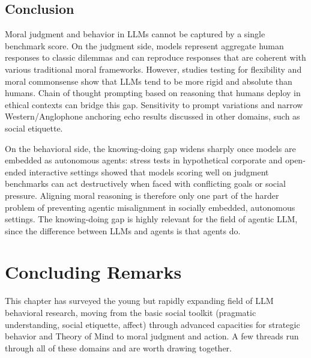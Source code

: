 \subsection{Conclusion}
Moral judgment and behavior in LLMs cannot be captured by a single benchmark score. On the judgment side, models represent aggregate human responses to classic dilemmas and can reproduce responses that are coherent with various traditional moral frameworks. However, studies testing for flexibility and moral commonsense show that LLMs tend to be more rigid and absolute than humans. Chain of thought prompting based on reasoning that humans deploy in ethical contexts can bridge this gap. Sensitivity to prompt variations and narrow Western/Anglophone anchoring echo results discussed in other domains, such as social etiquette. 

On the behavioral side, the knowing-doing gap widens sharply once models are embedded as autonomous agents: stress tests in hypothetical corporate and open-ended interactive settings showed that models scoring well on judgment benchmarks can act destructively when faced with conflicting goals or social pressure. Aligning moral reasoning is therefore only one part of the harder problem of preventing agentic misalignment in socially embedded, autonomous settings. The knowing-doing gap is highly relevant for the field of agentic LLM, since the difference between LLMs and agents is that agents do.

\section{Concluding Remarks}
This chapter has surveyed the young but rapidly expanding field of LLM behavioral
research, moving from the basic social toolkit (pragmatic understanding, social etiquette, affect) through advanced capacities for strategic behavior and Theory of Mind to moral judgment and action. A few threads run through all of these domains and are worth drawing together. 

